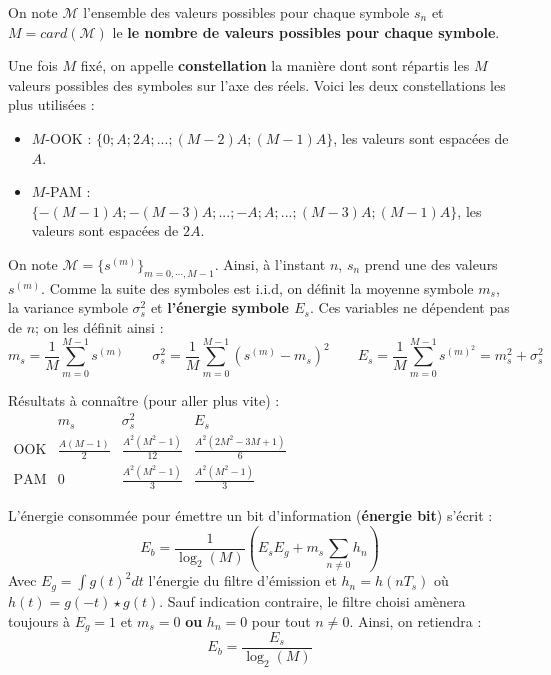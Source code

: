 	\begin{defn}
	On note \textbf{$\mathcal{M}$} l'ensemble des valeurs possibles pour chaque symbole $s_{n}$ et \textbf{$M = card(\mathcal{M})$} le \textbf{le nombre de valeurs possibles pour chaque symbole}.
	
	Une fois \textbf{$M$} fixé, on appelle \textbf{constellation} la manière dont sont répartis les \textbf{$M$} valeurs possibles des symboles sur l'axe des réels. Voici les deux constellations les plus utilisées :
	\begin{itemize}
	\item $M$-OOK : $\{0;A;2A;...;(M-2)A;(M-1)A\}$, les valeurs sont espacées de $A$.
	\item $M$-PAM : $\{-(M-1)A;-(M-3)A;...;-A;A;...;(M-3)A;(M-1)A\}$, les valeurs sont espacées de $2A$.
	\end{itemize}
	\end{defn}
	
	\begin{defn}
	On note \textbf{$\mathcal{M}=\{s^{(m)}\}_{m=0,\cdots,M-1}$}. Ainsi, à l'instant $n$, $s_{n}$ prend une des valeurs $s^{(m)}$.
	Comme la suite des symboles est i.i.d, on définit la moyenne symbole \textbf{$m_{s}$}, la variance symbole \textbf{$\sigma^{2}_{s}$} et \textbf{l'énergie symbole $E_{s}$}. Ces variables ne dépendent pas de $n$; on les définit ainsi :
	$$m_{s}=\frac{1}{M}\sum_{m=0}^{M-1}s^{(m)} \qquad
	\sigma^{2}_{s}=\frac{1}{M}\sum_{m=0}^{M-1}(s^{(m)}-m_{s})^2 \qquad
	E_{s}=\frac{1}{M}\sum_{m=0}^{M-1}s^{(m)^2}=m_s^2+\sigma_s^2$$
	\end{defn}	
	
	\begin{pop}
		Résultats à connaître (pour aller plus vite) :
		$\begin{array}{c|ccc}
		           & m_s                & \sigma_s^2               & E_s \\ \hline
		\text{OOK} & \frac{A(M - 1)}{2} & \frac{A^2 (M^2 - 1)}{12} & \frac{A^2(2M^2 - 3M + 1)}{6} \\
		\text{PAM} & 0                  & \frac{A^2 (M^2 - 1)}{3}  & \frac{A^{2}(M^{2}-1)}{3}
		\end{array}$
	\end{pop}
	
	\begin{pop}
		L'énergie consommée pour émettre un bit d'information (\textbf{énergie bit}) s'écrit :
		$$E_b = \frac{1}{\log_{2}(M)} \left( E_{s}E_{g}+m_{s} \sum_{n\neq 0} h_{n} \right)$$
		Avec $E_g=\int g(t)^2dt$ l'énergie du filtre d'émission et $h_n=h(nT_s)$ où $h(t)=g(-t)\star g(t)$.
		Sauf indication contraire, le filtre choisi amènera toujours à $E_g=1$ et $m_s=0$ \textbf{ou} $h_n=0$ pour tout $n\neq 0$. Ainsi, on retiendra :
		$$E_b = \frac{E_s}{\log_2(M)}$$
	\end{pop}

